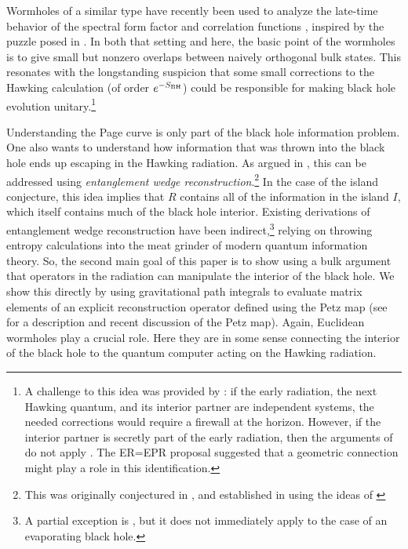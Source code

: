 \documentclass[11pt]{article}
\numberwithin{equation}{section}
\begin{document}
Wormholes of a similar type have recently been used to analyze the late-time behavior of the spectral form factor \cite{Saad:2018bqo,Saad:2019lba} and correlation functions \cite{Saad:2019pqd}, inspired by the puzzle posed in \cite{Maldacena:2001kr}. In both that setting and here, the basic point of the wormholes is to give small but nonzero overlaps between naively orthogonal bulk states. This resonates with the longstanding suspicion that some small corrections to the Hawking calculation (of order $e^{-S_{\rm BH}}$) could be responsible for making black hole evolution unitary.\footnote{A challenge to this idea was provided by \cite{Mathur:2009hf,Almheiri:2012rt}: if the early radiation, the next Hawking quantum, and its interior partner are independent systems, the needed corrections would require a firewall at the horizon. However, if the interior partner is secretly part of the early radiation, then the arguments of \cite{Mathur:2009hf,Almheiri:2012rt} do not apply \cite{Bousso:2012as,Nomura:2012sw,Verlinde:2012cy,Papadodimas:2012aq,Maldacena:2013xja}. The ER=EPR proposal \cite{Maldacena:2013xja} suggested that a geometric connection might play a role in this identification.}

Understanding the Page curve is only part of the black hole information problem. One also wants to understand how information that was thrown into the black hole ends up escaping in the Hawking radiation. As argued in \cite{Penington:2019npb,Almheiri:2019psf}, this can be addressed using \emph{entanglement wedge reconstruction}.\footnote{This was originally conjectured in \cite{Headrick:2014cta,Czech:2012bh,Wall:2012uf}, and established in \cite{Jafferis:2015del,Dong:2016eik,Cotler:2017erl} using the ideas of \cite{Faulkner:2013ana}} In the case of the island conjecture, this idea implies that $R$ contains all of the information in the island $I$, which itself contains much of the black hole interior. Existing derivations of entanglement wedge reconstruction have been indirect,\footnote{A partial exception is \cite{Faulkner:2017vdd}, but it does not immediately apply to the case of an evaporating black hole.} relying on throwing entropy calculations into the meat grinder of modern  quantum information theory. So, the second main goal of this paper is to show using a bulk argument that operators in the radiation can manipulate the interior of the black hole. We show this directly by using gravitational path integrals to evaluate matrix elements of an explicit reconstruction operator defined using the Petz map \cite{petz1986sufficient,petz1988sufficiency} (see \cite{Cotler:2017erl,chen2019entanglement} for a description and recent discussion of the Petz map). Again, Euclidean wormholes play a crucial role. Here they are in some sense connecting the interior of the black hole to the quantum computer acting on the Hawking radiation.
\end{document}
